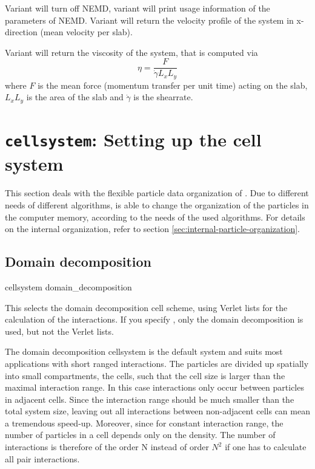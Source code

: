 Variant  will turn off NEMD, variant  will
print usage information of the parameters of NEMD. Variant  will return the
velocity profile of the system in x-direction (mean velocity per slab).

Variant  will return the viscosity of the system, that is
computed via
\begin{equation}
  \eta = \frac{F}{\dot{\gamma} L_x L_y}
\end{equation}
where $F$ is the mean force (momentum transfer per unit time) acting
on the slab, $L_x L_y$ is the area of the slab and $\dot{\gamma}$ is the shearrate. 


\section{\texttt{cellsystem}: Setting up the cell system}
\label{sec:cell-systems}

This section deals with the flexible particle data organization of
\es.  Due to different needs of different algorithms, \es is able to
change the organization of the particles in the computer memory,
according to the needs of the used algorithms. For details on the
internal organization, refer to section
\vref{sec:internal-particle-organization}.

\subsection{Domain decomposition}
\begin{essyntax}
  cellsystem domain_decomposition 
\end{essyntax}
This selects the domain decomposition cell scheme, using Verlet lists
for the calculation of the interactions. If you specify
, only the domain decomposition is used, but
not the Verlet lists.

The domain decomposition cellsystem is the default system and suits
most applications with short ranged interactions. The particles are
divided up spatially into small compartments, the cells, such that the
cell size is larger than the maximal interaction range. In this case
interactions only occur between particles in adjacent cells. Since the
interaction range should be much smaller than the total system size,
leaving out all interactions between non-adjacent cells can mean a
tremendous speed-up. Moreover, since for constant interaction range,
the number of particles in a cell depends only on the density. The
number of interactions is therefore of the order N instead of order
$N^2$ if one has to calculate all pair interactions.

